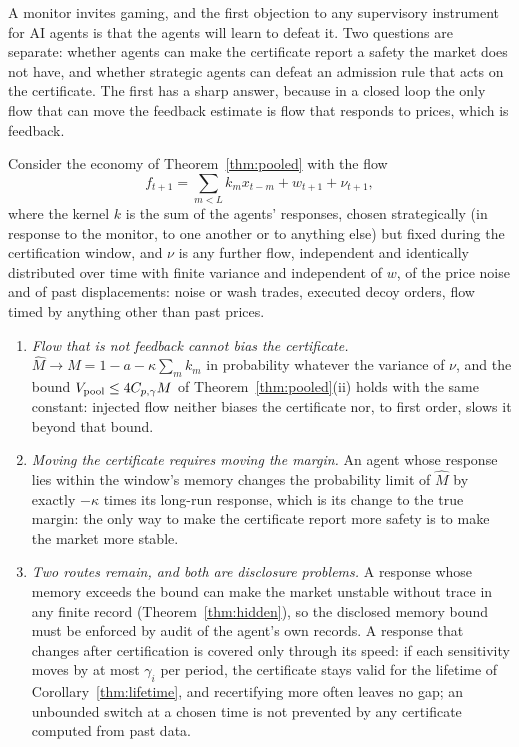 
A monitor invites gaming, and the first objection to any supervisory instrument for AI agents is that the agents will learn to defeat it. Two questions are separate: whether agents can make the certificate report a safety the market does not have, and whether strategic agents can defeat an admission rule that acts on the certificate. The first has a sharp answer, because in a closed loop the only flow that can move the feedback estimate is flow that responds to prices, which is feedback.

\begin{theorem}\label{thm:nogaming}
Consider the economy of Theorem~\ref{thm:pooled} with the flow
\[
f_{t+1}=\sum_{m<L}k_m x_{t-m}+w_{t+1}+\nu_{t+1},
\]
where the kernel $k$ is the sum of the agents' responses, chosen strategically (in response to the monitor, to one another or to anything else) but fixed during the certification window, and $\nu$ is any further flow, independent and identically distributed over time with finite variance and independent of $w$, of the price noise and of past displacements: noise or wash trades, executed decoy orders, flow timed by anything other than past prices.
\begin{enumerate}[label=(\roman*)]
\item \emph{Flow that is not feedback cannot bias the certificate.} $\hat M\to M=1-a-\kappa\sum_mk_m$ in probability whatever the variance of $\nu$, and the bound $V_{\rm pool}\le4C_{p,\gamma}M$ of Theorem~\ref{thm:pooled}(ii) holds with the same constant: injected flow neither biases the certificate nor, to first order, slows it beyond that bound.
\item \emph{Moving the certificate requires moving the margin.} An agent whose response lies within the window's memory changes the probability limit of $\hat M$ by exactly $-\kappa$ times its long-run response, which is its change to the true margin: the only way to make the certificate report more safety is to make the market more stable.
\item \emph{Two routes remain, and both are disclosure problems.} A response whose memory exceeds the bound can make the market unstable without trace in any finite record (Theorem~\ref{thm:hidden}), so the disclosed memory bound must be enforced by audit of the agent's own records. A response that changes after certification is covered only through its speed: if each sensitivity moves by at most $\gamma_i$ per period, the certificate stays valid for the lifetime of Corollary~\ref{thm:lifetime}, and recertifying more often leaves no gap; an unbounded switch at a chosen time is not prevented by any certificate computed from past data.
\end{enumerate}
\hfill\Proved
\end{theorem}

